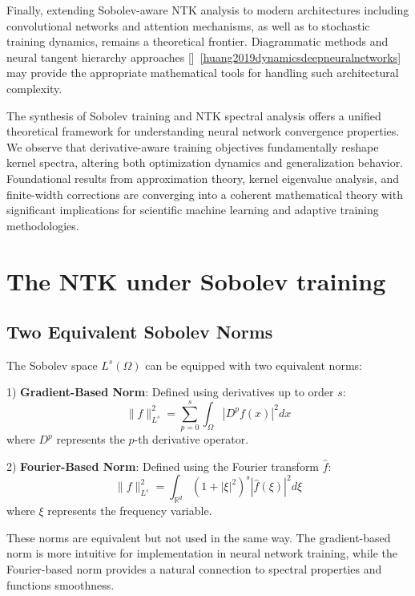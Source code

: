 \documentclass[a4paper]{article}
\theoremstyle{plain}
\theoremstyle{definition}
\theoremstyle{remark}
\begin{document}
Finally, extending Sobolev-aware NTK analysis to modern architectures including convolutional networks and attention mechanisms, as well as to stochastic training dynamics, remains a theoretical frontier. Diagrammatic methods and neural tangent hierarchy approaches []~\ref{huang2019dynamicsdeepneuralnetworks} may provide the appropriate mathematical tools for handling such architectural complexity.

The synthesis of Sobolev training and NTK spectral analysis offers a unified theoretical framework for understanding neural network convergence properties. We observe that derivative-aware training objectives fundamentally reshape kernel spectra, altering both optimization dynamics and generalization behavior. Foundational results from approximation theory, kernel eigenvalue analysis, and finite-width corrections are converging into a coherent mathematical theory with significant implications for scientific machine learning and adaptive training methodologies.





\newpage
\section{The NTK under Sobolev training}
\subsection{Two Equivalent Sobolev Norms}

The Sobolev space $L^s(\Omega)$ can be equipped with two equivalent norms:

1) \textbf{Gradient-Based Norm}: Defined using derivatives up to order $s$:
\begin{equation}
\label{eq:sobolev_gradient_norm}
\|f\|_{L^s}^2 = \sum_{p=0}^s \int_{\Omega} |D^p f(x)|^2 dx
\end{equation}
where $D^p$ represents the $p$-th derivative operator.

2) \textbf{Fourier-Based Norm}: Defined using the Fourier transform $\hat{f}$:
\begin{equation}
\label{eq:sobolev_fourier_norm}
\|f\|_{L^s}^2 = \int_{\mathbb{R}^d} (1 + |\xi|^2)^s |\hat{f}(\xi)|^2 d\xi
\end{equation}
where $\xi$ represents the frequency variable.

These norms are equivalent but not used in the same way. 
The gradient-based norm is more intuitive for implementation in neural network training, while the Fourier-based norm provides a natural 
connection to spectral properties and functions smoothness.
\end{document}
